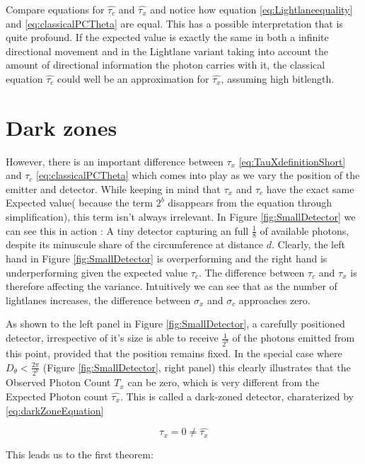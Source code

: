\documentclass[notitlepage]{article}
\begin{document}
Compare equations for $\hat{\tau_c} $ and $\hat{\tau_x} $ and notice how equation  \eqref{eq:Lightlaneequality} and  \eqref{eq:classicalPCTheta} are equal. This has a possible interpretation that is quite profound. If the expected value is exactly the same in both a infinite directional movement and in the Lightlane variant taking into account the amount of directional information the photon carries with it, the classical equation  $\hat{\tau_c} $ could well be an approximation for  $\hat{\tau_x} $, assuming high bitlength.


\section{Dark zones}
However, there is an important difference between  $ \tau_x $ \eqref{eq:TauXdefinitionShort} and $ \tau_c$ \eqref{eq:classicalPCTheta}  which comes into play as we vary the position of the emitter and detector.
While keeping in mind that  $\tau_x$  and $ \tau_c$ have the exact same Expected value( because the term $2^b$ disappears from the equation through simplification), this term isn't always irrelevant. In Figure \ref{fig:SmallDetector} we can see this in action : A tiny detector capturing an full $\frac{1}{8} $ of available photons, despite its minuscule share of the circumference at distance $d$. Clearly, the left hand in Figure \ref{fig:SmallDetector}  is overperforming and the right hand is underperforming given the expected value $\tau_c$. The difference between $\tau_c$ and $\tau_x$ is therefore affecting the variance. Intuitively we can see that as the number of lightlanes increases, the difference between $\sigma_x$ and $\sigma_c$ approaches zero.


As shown to the left panel in Figure \ref{fig:SmallDetector}, a carefully positioned detector, irrespective of it's size is able to receive $ \frac{1}{2^b}  $ of the photons emitted from this point, provided that the position remains fixed. In the special case where  $ D_\theta < \frac{2 \pi}{ 2^b} $ (Figure \ref{fig:SmallDetector}, right panel)  this clearly illustrates that the Observed Photon Count $T_x$ can be zero, which is very  different from the Expected Photon count $\hat{\tau_x}$. This is called a dark-zoned detector, charaterized by \ref{eq:darkZoneEquation}

\begin{equation}
 \tau_x = 0  \neq \hat{\tau_x}
 \label{eq:darkZoneEquation}
\end{equation}

This leads us to the first theorem:
\end{document}
